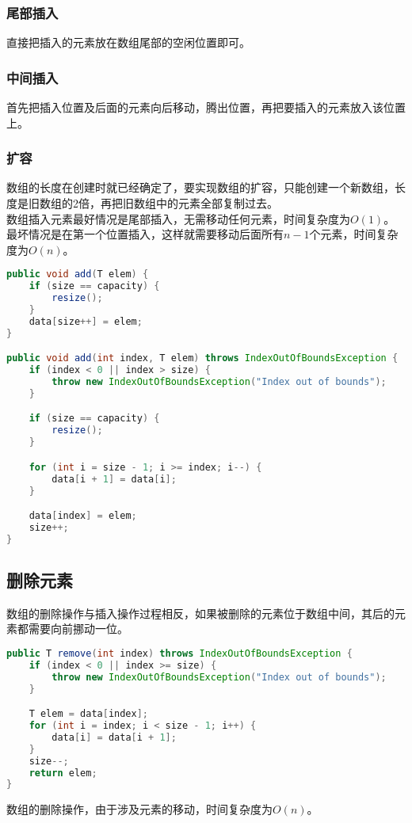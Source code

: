 \subsubsection{尾部插入}

直接把插入的元素放在数组尾部的空闲位置即可。

\subsubsection{中间插入}

首先把插入位置及后面的元素向后移动，腾出位置，再把要插入的元素放入该位置上。\\

\subsubsection{扩容}

数组的长度在创建时就已经确定了，要实现数组的扩容，只能创建一个新数组，长度是旧数组的2倍，再把旧数组中的元素全部复制过去。\\

数组插入元素最好情况是尾部插入，无需移动任何元素，时间复杂度为$ O(1) $。最坏情况是在第一个位置插入，这样就需要移动后面所有$ n - 1 $个元素，时间复杂度为$ O(n) $。\\


\begin{lstlisting}[language=Java]
public void add(T elem) {
    if (size == capacity) {
        resize();
    }
    data[size++] = elem;
}

public void add(int index, T elem) throws IndexOutOfBoundsException {
    if (index < 0 || index > size) {
        throw new IndexOutOfBoundsException("Index out of bounds");
    }

    if (size == capacity) {
        resize();
    }

    for (int i = size - 1; i >= index; i--) {
        data[i + 1] = data[i];
    }

    data[index] = elem;
    size++;
}
\end{lstlisting}

\subsection{删除元素}

数组的删除操作与插入操作过程相反，如果被删除的元素位于数组中间，其后的元素都需要向前挪动一位。\\


\begin{lstlisting}[language=Java]
public T remove(int index) throws IndexOutOfBoundsException {
    if (index < 0 || index >= size) {
        throw new IndexOutOfBoundsException("Index out of bounds");
    }

    T elem = data[index];
    for (int i = index; i < size - 1; i++) {
        data[i] = data[i + 1];
    }
    size--;
    return elem;
}
\end{lstlisting}

数组的删除操作，由于涉及元素的移动，时间复杂度为$ O(n) $。\\

\newpage